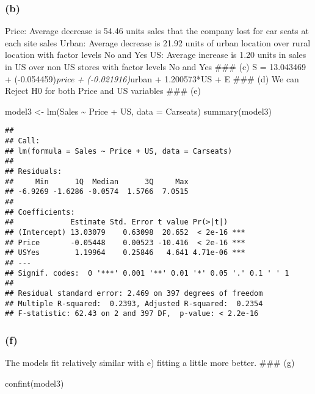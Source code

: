 \documentclass[
]{article}
\newenvironment{Shaded}{\begin{snugshade}}{\end{snugshade}}
\newcommand{\AttributeTok}[1]{\textcolor[rgb]{0.77,0.63,0.00}{#1}}
\newcommand{\FunctionTok}[1]{\textcolor[rgb]{0.00,0.00,0.00}{#1}}
\newcommand{\NormalTok}[1]{#1}
\newcommand{\OtherTok}[1]{\textcolor[rgb]{0.56,0.35,0.01}{#1}}
\newcommand{\SpecialCharTok}[1]{\textcolor[rgb]{0.00,0.00,0.00}{#1}}
\begin{document}
\hypertarget{b-2}{%
\subsubsection{(b)}\label{b-2}}

Price: Average decrease is 54.46 units sales that the company lost for
car seats at each site sales Urban: Average decrease is 21.92 units of
urban location over rural location with factor levels No and Yes US:
Average increase is 1.20 units in sales in US over non US stores with
factor levels No and Yes \#\#\# (c) S = 13.043469 +
(-0.054459)\emph{price + (-0.021916)}urban + 1.200573*US + E \#\#\# (d)
We can Reject H0 for both Price and US variables \#\#\# (e)

\begin{Shaded}
\begin{Highlighting}[]
\NormalTok{model3 }\OtherTok{\textless{}{-}} \FunctionTok{lm}\NormalTok{(Sales }\SpecialCharTok{\textasciitilde{}}\NormalTok{ Price }\SpecialCharTok{+}\NormalTok{ US, }\AttributeTok{data =}\NormalTok{ Carseats)}
\FunctionTok{summary}\NormalTok{(model3)}
\end{Highlighting}
\end{Shaded}

\begin{verbatim}
## 
## Call:
## lm(formula = Sales ~ Price + US, data = Carseats)
## 
## Residuals:
##     Min      1Q  Median      3Q     Max 
## -6.9269 -1.6286 -0.0574  1.5766  7.0515 
## 
## Coefficients:
##             Estimate Std. Error t value Pr(>|t|)    
## (Intercept) 13.03079    0.63098  20.652  < 2e-16 ***
## Price       -0.05448    0.00523 -10.416  < 2e-16 ***
## USYes        1.19964    0.25846   4.641 4.71e-06 ***
## ---
## Signif. codes:  0 '***' 0.001 '**' 0.01 '*' 0.05 '.' 0.1 ' ' 1
## 
## Residual standard error: 2.469 on 397 degrees of freedom
## Multiple R-squared:  0.2393, Adjusted R-squared:  0.2354 
## F-statistic: 62.43 on 2 and 397 DF,  p-value: < 2.2e-16
\end{verbatim}

\hypertarget{f-1}{%
\subsubsection{(f)}\label{f-1}}

The models fit relatively similar with e) fitting a little more better.
\#\#\# (g)

\begin{Shaded}
\begin{Highlighting}[]
\FunctionTok{confint}\NormalTok{(model3)}
\end{Highlighting}
\end{Shaded}
\end{document}
